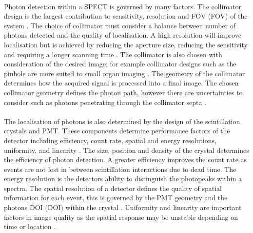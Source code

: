 \paragraph{}
Photon detection within a \acrshort{SPECT} is governed by many factors. The collimator design is the largest contribution to sensitivity, resolution and \acrlong{FOV} (\acrshort{FOV}) of the system \cite{0031-9155-50-21-004}. The choice of collimator must consider a balance between number of photons detected and the quality of localisation. A high resolution will improve localisation but is achieved by reducing the aperture size, reducing the sensitivity and requiring a longer scanning time \cite{doi:10.1001/jama.1965.03080190014004}. The collimator is also chosen with consideration of the desired image; for example collimator designs such as the pinhole are more suited to small organ imaging \cite{1076033}. The geometry of the collimator determines how the acquired signal is processed into a final image. The chosen collimator geometry defines the photon path, however there are uncertainties to consider such as photons penetrating through the collimator septa \cite{Accorsi2008DerivationCollimation} \cite{0031-9155-18-6-005}. 
\paragraph{}
The localisation of photons is also determined by the design of the scintillation crystals and \acrshort{PMT}. These components determine performance factors of the detector including efficiency, count rate, spatial and energy resolutions, uniformity, and linearity \cite{Anger1966SensitivityCamera} \cite{Sorenson1987}. The size, position and density of the crystal determines the efficiency of photon detection. A greater efficiency improves the count rate as events are not lost in between scintillation interactions due to dead time. The energy resolution is the detectors ability to distinguish the photopeaks within a spectra. The spatial resolution of a detector defines the quality of spatial information for each event, this is governed by the \acrshort{PMT} geometry and the photons \acrlong{DOI} (\acrshort{DOI}) within the crystal \cite{Morrocchi2017}. Uniformity and linearity are important factors in image quality as the spatial response may be unstable depending on time or location \cite{LyraGeorgosopoulouRoutineInstrumentation}.

